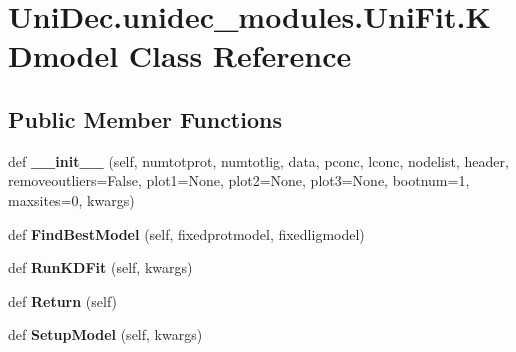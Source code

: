\hypertarget{class_uni_dec_1_1unidec__modules_1_1_uni_fit_1_1_k_dmodel}{}\section{Uni\+Dec.\+unidec\+\_\+modules.\+Uni\+Fit.\+K\+Dmodel Class Reference}
\label{class_uni_dec_1_1unidec__modules_1_1_uni_fit_1_1_k_dmodel}
\subsection*{Public Member Functions}
\begin{DoxyCompactItemize}
\item 
\hypertarget{class_uni_dec_1_1unidec__modules_1_1_uni_fit_1_1_k_dmodel_ac6a44a79a7137fd8941a0bc99fbc7ec2}{}def {\bfseries \+\_\+\+\_\+init\+\_\+\+\_\+} (self, numtotprot, numtotlig, data, pconc, lconc, nodelist, header, removeoutliers=False, plot1=None, plot2=None, plot3=None, bootnum=1, maxsites=0, kwargs)\label{class_uni_dec_1_1unidec__modules_1_1_uni_fit_1_1_k_dmodel_ac6a44a79a7137fd8941a0bc99fbc7ec2}

\item 
\hypertarget{class_uni_dec_1_1unidec__modules_1_1_uni_fit_1_1_k_dmodel_a8fdde80b49979574531f0f2c34b7f501}{}def {\bfseries Find\+Best\+Model} (self, fixedprotmodel, fixedligmodel)\label{class_uni_dec_1_1unidec__modules_1_1_uni_fit_1_1_k_dmodel_a8fdde80b49979574531f0f2c34b7f501}

\item 
\hypertarget{class_uni_dec_1_1unidec__modules_1_1_uni_fit_1_1_k_dmodel_a7780889f46a9b9565235e8f670d1a0c4}{}def {\bfseries Run\+K\+D\+Fit} (self, kwargs)\label{class_uni_dec_1_1unidec__modules_1_1_uni_fit_1_1_k_dmodel_a7780889f46a9b9565235e8f670d1a0c4}

\item 
\hypertarget{class_uni_dec_1_1unidec__modules_1_1_uni_fit_1_1_k_dmodel_a61daa959cb6dfacda8a4876403895a0a}{}def {\bfseries Return} (self)\label{class_uni_dec_1_1unidec__modules_1_1_uni_fit_1_1_k_dmodel_a61daa959cb6dfacda8a4876403895a0a}

\item 
\hypertarget{class_uni_dec_1_1unidec__modules_1_1_uni_fit_1_1_k_dmodel_af9db0fb748a66e4d46ea16278f6fdc0e}{}def {\bfseries Setup\+Model} (self, kwargs)\label{class_uni_dec_1_1unidec__modules_1_1_uni_fit_1_1_k_dmodel_af9db0fb748a66e4d46ea16278f6fdc0e}


\end{DoxyCompactItemize}

